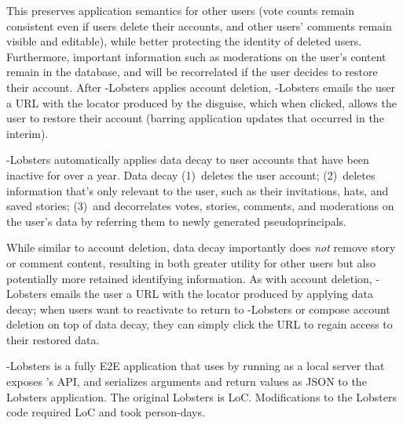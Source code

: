 This preserves application semantics for other users (\eg vote counts remain consistent even if
users delete their accounts, and other users' comments remain visible and editable), while better
protecting the identity of deleted users.  Furthermore, important information such as moderations on
the user's content remain in the database, and will be recorrelated if the user decides to restore
their account.  After \sys-Lobsters applies account deletion, \sys-Lobsters emails the user a URL with the
locator produced by the disguise, which when clicked, allows the user to restore their account
(barring application updates that occurred in the interim).

\sys-Lobsters automatically applies data decay to user accounts that have been inactive for over a year.
Data decay 
%
(1)~deletes the user account;
%
(2)~deletes information that's only relevant to the user, such as their invitations, hats, and saved
stories;
%
(3)~and decorrelates votes, stories, comments, and moderations on the user's data by referring them
to newly generated pseudoprincipals.
%

While similar to account deletion, data decay importantly does \emph{not} remove story or comment
content, resulting in both greater utility for other users but also potentially more retained
identifying information.  As with account deletion, \sys-Lobsters emails the user a URL with the locator
produced by applying data decay; when users want to reactivate to return to \sys-Lobsters or compose
account deletion on top of data decay, they can simply click the URL to regain access to their
restored data.

\sys-Lobsters is a fully E2E application that uses \sys by running \sys as a local
server that exposes \sys's API, and serializes arguments and return values as JSON to the Lobsters
application. 
The original Lobsters is LoC. 
Modifications to the Lobsters code required LoC and took  person-days.

